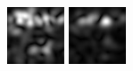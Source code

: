 \begin{figure}[ht]
\begin{center}
 \includegraphics[width=\columnwidth/9]{ch4/figures/mag_0_5.jpg}
 \includegraphics[width=\columnwidth/9]{ch4/figures/mag_0_6.jpg}

\end{center}
\end{figure}
